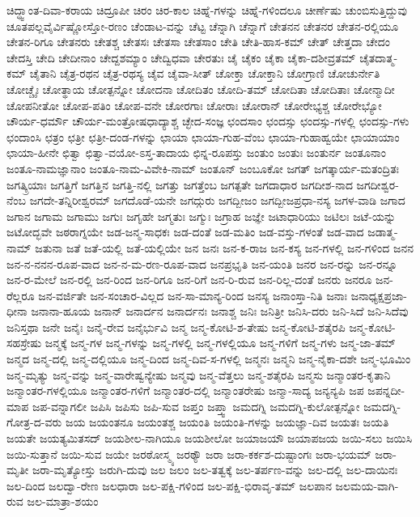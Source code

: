 {ಚಿದ್ಧ್ವಾಂತ-ದಿವಾ-ಕರಾಯ
ಚಿದ್ರೂಪೀ
ಚಿರಂ
ಚಿರ-ಕಾಲ
ಚಿಹ್ನೆ-ಗಳನ್ನು
ಚಿಹ್ನೆ-ಗಳಿಂದಲೂ
ಚೀರ್ಣೆಷು
ಚುಂಬಿಸುತ್ತಿದ್ದುವು
ಚೂತಪಲ್ಲವೈರ್ವಿಷ್ಣೋಸ್ತೋ-ರಣಂ
ಚೆಂಡಾಟ-ವನ್ನು
ಚೆಟ್ಟ
ಚೆನ್ನಾಗಿ
ಚೆನ್ನಾಗೆ
ಚೇತನನ
ಚೇತನರ
ಚೇತನ-ರಲ್ಲಿಯೂ
ಚೇತನ-ರಿಗೂ
ಚೇತನರು
ಚೇತಶ್ಚ
ಚೇತಸಃ
ಚೇತಸಾ
ಚೇತಸಾಂ
ಚೇತಿ
ಚೇತಿ-ಹಾಸ-ಕಮ್
ಚೇತ್
ಚೇತ್ತದಾ
ಚೇದಂ
ಚೇದಸ್ತಿ
ಚೇದಿ
ಚೇದೀನಾಂ
ಚೇದ್ದಶಮ್ಯಾಂ
ಚೇದ್ವಿಧವಾ
ಚೇರತುಃ
ಚೈ
ಚೈಕಂ
ಚೈಕಾ
ಚೈಕಾ-ದಶೀವ್ರತಮ್
ಚೈತದಾತ್ಮ-ಕಮ್
ಚೈತಾನಿ
ಚೈತ್ರ-ರಥನ
ಚೈತ್ರ-ರಥಸ್ಯ
ಚೈವ
ಚೈವಾ-ಸೀತ್
ಚೋಕ್ತಾ
ಚೋಕ್ತಾನಿ
ಚೋಗ್ರಾಣಿ
ಚೋಚುರ್ನೇತಿ
ಚೋಚ್ಚೈಃ
ಚೋತ್ಥಾಯ
ಚೋತ್ಪನ್ನೋ
ಚೋದನಾ
ಚೋದಿತಂ
ಚೋದಿ-ತಮ್
ಚೋದಿತಾ
ಚೋದಿತಾಃ
ಚೋನ್ಮಾದೀ
ಚೋಪನೀತೋ
ಚೋಪ-ಪತಿಂ
ಚೋಪ-ವನೇ
ಚೋರಗಾಃ
ಚೋರಾಃ
ಚೋರಾನ್
ಚೋರೇಭ್ಯಶ್ಚ
ಚೋರೇಭ್ಯೋ
ಚೌರ್ಯ-ಧರ್ಮೌ
ಚೌರ್ಯ-ಮಂತ್ರೋಷಧಾದ್ಯಾಶ್ಚ
ಚ್ಛೇದ-ಸಂಜ್ಞ
ಛಂದಸಾಂ
ಛಂದಸ್ಸು
ಛಂದಸ್ಸು-ಗಳಲ್ಲಿ
ಛಂದಸ್ಸು-ಗಳು
ಛಂದಾಂಸಿ
ಛತ್ರಂ
ಛತ್ರೀ
ಛತ್ರೀ-ದಂಡ-ಗಳನ್ನು
ಛಾಯಾ
ಛಾಯಾ-ಗುಹ-ವೆಂಬ
ಛಾಯಾ-ಗುಹಾಹ್ವಯೇ
ಛಾಯಾಯಾಂ
ಛಾಯಾ-ಹೀನೇ
ಛಿತ್ವಾ
ಛಿತ್ವಾ-ವಯೋ-ಽಸ್ತ-ತಾದಾಯ
ಛಿನ್ನ-ರೂಪಸ್ತು
ಜಂತುಂ
ಜಂತುಃ
ಜಂತುರ್ನ
ಜಂತೂನಾಂ
ಜಂತೂ-ನಾಮಜ್ಞಾನಾಂ
ಜಂತೂ-ನಾಮ-ವಿವೇಕಿ-ನಾಮ್
ಜಂತೂನ್
ಜಂಬೂಕೋ
ಜಗತ್
ಜಗತ್ಕಾರ್ಯ-ಮತಂದ್ರಿತಃ
ಜಗತ್ಕ್ರಿಯಾಃ
ಜಗತ್ತಿಗೆ
ಜಗತ್ತಿನ
ಜಗತ್ತಿ-ನಲ್ಲಿ
ಜಗತ್ತು
ಜಗತ್ತೆಂಬ
ಜಗತ್ಪತೇ
ಜಗದಾಧಾರ
ಜಗದೀಶ-ನಾದ
ಜಗದೀಶ್ವರ-ನೆಂಬ
ಜಗದೇ-ತನ್ನಿರೀಶ್ವರಮ್
ಜಗದೊಡೆ-ಯನೇ
ಜಗದ್ಗುರು
ಜಗದ್ಬೀಜಂ
ಜಗದ್ಬೀಜಪ್ರಧಾ-ನಸ್ಯ
ಜಗಳ-ವಾಡಿ
ಜಗಾದ
ಜಗಾನ
ಜಗಾಮ
ಜಗಾಮು
ಜಗುಃ
ಜಗೃಹೇ
ಜಗ್ಮತುಃ
ಜಗ್ಮುಃ
ಜಗ್ರಾಹ
ಜಜ್ಞೇ
ಜಟಾಧಾರಿಯು
ಜಟಿಲಃ
ಜಟೆ-ಯನ್ನು
ಜಟೋದ್ಭವೇ
ಜಠರಾಗ್ನಯೇ
ಜಡ-ಜನ್ಮ-ಸಾಧಕಃ
ಜಡ-ದಂತೆ
ಜಡ-ಮತಿಂ
ಜಡ-ವಸ್ತು-ಗಳಂತೆ
ಜಡ-ವಾದ
ಜಡಾತ್ಮ-ನಾಮ್
ಜತುನಾ
ಜತೆ
ಜತೆ-ಯಲ್ಲಿ
ಜತೆ-ಯಲ್ಲಿಯೇ
ಜನ
ಜನಃ
ಜನ-ಕ-ರಾಜ
ಜನ-ಕಸ್ಯ
ಜನ-ಗಳಲ್ಲಿ
ಜನ-ಗಳಿಂದ
ಜನನ
ಜನ-ನ-ನನನ-ರೂಪ-ವಾದ
ಜನ-ನ-ಮ-ರಣ-ರೂಪ-ವಾದ
ಜನಪ್ರಭೃತಿ
ಜನ-ಯಂತಿ
ಜನರ
ಜನ-ರನ್ನು
ಜನ-ರನ್ನೂ
ಜನ-ರ-ಮೇಲೆ
ಜನ-ರಲ್ಲಿ
ಜನ-ರಿಂದ
ಜನ-ರಿಗೂ
ಜನ-ರಿಗೆ
ಜನ-ರಿ-ರುವ
ಜನ-ರಿಲ್ಲ-ದಂತೆ
ಜನರು
ಜನರೂ
ಜನ-ರೆಲ್ಲರೂ
ಜನ-ವರ್ಜಿತೇ
ಜನ-ಸಂಚಾರ-ವಿಲ್ಲದ
ಜನ-ಸಾ-ಮಾನ್ಯ-ರಿಂದ
ಜನಸ್ಯ
ಜನಾಂಸ್ತಾ-ನಿತಿ
ಜನಾಃ
ಜನಾಧ್ಯಕ್ಷಪ್ರಜಾ-ಧೀನಾ
ಜನಾನಾ-ಹೂಯ
ಜನಾನ್
ಜನಾರ್ದನ
ಜನಾರ್ದನಃ
ಜನಾಶ್ಚ
ಜನಿಃ
ಜನಿತ್ರೀ
ಜನಿಸಿ-ದರು
ಜನಿ-ಸಿದೆ
ಜನಿ-ಸಿದೆವು
ಜನಿಸ್ತಥಾ
ಜನೇ
ಜನೈಃ
ಜನೈ-ರೇವ
ಜನೈರ್ಭುವಿ
ಜನ್ಮ
ಜನ್ಮ-ಕೋಟಿ-ಶ-ತೇಷು
ಜನ್ಮ-ಕೋಟಿ-ಶತೈರಪಿ
ಜನ್ಮ-ಕೋಟಿ-ಸಹಸ್ರೇಷು
ಜನ್ಮಕ್ಕೆ
ಜನ್ಮ-ಗಳ
ಜನ್ಮ-ಗಳನ್ನು
ಜನ್ಮ-ಗಳಲ್ಲಿ
ಜನ್ಮ-ಗಳಲ್ಲಿಯೂ
ಜನ್ಮ-ಗಳಿಗೆ
ಜನ್ಮ-ಗಳು
ಜನ್ಮ-ಜಾ-ತಮ್
ಜನ್ಮದ
ಜನ್ಮ-ದಲ್ಲಿ
ಜನ್ಮ-ದಲ್ಲಿಯೂ
ಜನ್ಮ-ದಿಂದ
ಜನ್ಮ-ದಿವ-ಸ-ಗಳಲ್ಲಿ
ಜನ್ಮನಃ
ಜನ್ಮನಿ
ಜನ್ಮ-ನೈಕಾ-ದಶೇ
ಜನ್ಮ-ಭೂಮಿಂ
ಜನ್ಮ-ಮೃತ್ಯು
ಜನ್ಮ-ವನ್ನು
ಜನ್ಮ-ವಾರೇಷ್ವನ್ಯೇಷು
ಜನ್ಮವು
ಜನ್ಮ-ವೆತ್ತಲು
ಜನ್ಮ-ಶತೈರಪಿ
ಜನ್ಮಸು
ಜನ್ಮಾಂತರ-ಕೃತಾನಿ
ಜನ್ಮಾಂತರ-ಗಳಲ್ಲಿಯೂ
ಜನ್ಮಾಂತರ-ಗಳಿಗೆ
ಜನ್ಮಾಂತರ-ದಲ್ಲಿ
ಜನ್ಮಾಂತರೇಷು
ಜನ್ಮಾ-ಸಾದ್ಯ
ಜನ್ಯನ್ಯಪಿ
ಜಪ
ಜಪನ್ನದೀ-ಮಾಪ
ಜಪ-ವನ್ನಾಗಲೀ
ಜಪಿಸಿ
ಜಪಿಸು
ಜಪಿ-ಸುವ
ಜಪ್ತಂ
ಜಪ್ತ್ವಾ
ಜಮದಗ್ನಿ
ಜಮದಗ್ನಿ-ಕುಲೋತ್ಪನ್ನೋ
ಜಮದಗ್ನಿ-ಗೋತ್ರ-ದ-ವರು
ಜಯ
ಜಯಂತನೂ
ಜಯಂತಶ್ಚ
ಜಯಂತಿ
ಜಯಂತಿ-ಗಳನ್ನು
ಜಯಜ್ಞಾ-ದಿವ
ಜಯತಃ
ಜಯತಿ
ಜಯತೇ
ಜಯತ್ಯಮಿತಸದ್
ಜಯಶೀಲ-ನಾಗಿಯೂ
ಜಯಶೀಲೋ
ಜಯಾಜಯೌ
ಜಯಾಪಜಯ
ಜಯಿ-ಸಲು
ಜಯಿಸಿ
ಜಯಿ-ಸುತ್ತಾನೆ
ಜಯಿ-ಸುವ
ಜಯೇ
ಜರಠೋಸ್ಮ್ಯ
ಜರಠ್ಯೌ
ಜರಾ
ಜರಾ-ಕರ್ಕಶ-ದುಷ್ಟಾಂಗಃ
ಜರಾ-ಭಯಮ್
ಜರಾ-ಮೃತೀ
ಜರಾ-ಮೃತ್ಯೋಸ್ತು
ಜರುಗಿ-ದುವು
ಜಲ
ಜಲಂ
ಜಲ-ತತ್ವಕ್ಕೆ
ಜಲ-ತರ್ಪಣ-ವನ್ನು
ಜಲ-ದಲ್ಲಿ
ಜಲ-ದಾಯಿನಃ
ಜಲ-ದಿಂದ
ಜಲದ್ವಾ-ರೇಣ
ಜಲಧಾರಾ
ಜಲ-ಪಕ್ಷಿ-ಗಳಿಂದ
ಜಲ-ಪಕ್ಷಿ-ಭಿರಾವೃ-ತಮ್
ಜಲಪಾನ
ಜಲಮಯ-ವಾಗಿ-ರುವ
ಜಲ-ಮಾತ್ರಾ-ಶಯಂ
}

